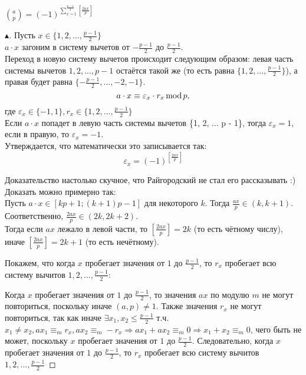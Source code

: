 \begin{theorem}
    $\binom{a}{p} = (-1)^{ \sum \limits_{x=1}^{ \frac{p-1}{2} } \left[ \frac{2ax}{p} \right] }$
    \begin{proof}[$\blacktriangle$]
        Пусть $x \in \{1, 2, ..., \frac{p - 1}{2}\}$\\
        $a \cdot x$ загоним в систему вычетов от $-\frac{p-1}{2}$ до $\frac{p-1}{2}$.\\
        
        Переход в новую систему вычетов происходит следующим образом: левая часть системы вычетов ${1, 2, ..., p - 1}$ остаётся такой же (то есть равна $\{1, 2, ..., \frac{p - 1}{2}\}$), а правая будет равна $\{-\frac{p - 1}{2}, ..., -2, -1\}$.\\
        
        $$
            a \cdot x \equiv \varepsilon_x \cdot r_x \operatorname{mod}{p},
        $$ где $\varepsilon_x \in \{-1, 1\}, r_x \in \{1, 2, ..., \frac{p-1}{2}\}$\\
        
        Если $a \cdot x$ попадет в левую часть системы вычетов \{1, 2, ... p - 1\}, тогда $\varepsilon_x = 1$, если в правую, то $\varepsilon_x = -1$.\\
        
        Утверждается, что математически это записывается так:
        $$
            \varepsilon_x = (-1)^{\left[ \frac{2ax}{p} \right]}
        $$
        
        Доказательство настолько скучное, что Райгородский не стал его рассказывать :)\\
        
        Доказать можно примерно так:\\
        
        Пусть $a \cdot x \in [kp + 1; (k + 1)p - 1]$ для некоторого $k$. Тогда $\frac{ax}{p} \in (k, k + 1)$. Соответственно, $\frac{2ax}{p} \in (2k, 2k + 2)$.\\
        
        Тогда если $ax$ лежало в левой части, то $\left[ \frac{2ax}{p} \right] = 2k$ (то есть чётному числу), иначе $\left[ \frac{2ax}{p} \right] = 2k + 1$ (то есть нечётному).
        
        Покажем, что когда $x$ пробегает значения от $1$ до $\frac{p-1}{2}$, то $r_x$ пробегает всю систему вычитов $1, 2, ..., \frac{p-1}{2}$:
        
        Когда $x$ пробегает значения от $1$ до $\frac{p-1}{2}$, то значения $ax$ по модулю $m$ не могут повториться, поскольку иначе $(a, p) \neq 1$. Также значения $r_x$ не могут повториться, так как иначе $\exists x_1, x_2 \leq \frac{p-1}{2}$ т.ч. $x_1 \neq x_2, ax_1 \equiv_m r_x, ax_2 \equiv_m -r_x \Rightarrow ax_1 + ax_2 \equiv_m 0 \Rightarrow x_1 + x_2 \equiv_m 0$, чего быть не может, поскольку $x$ пробегает значения от $1$ до $\frac{p-1}{2}$. Следовательно, когда $x$ пробегает значения от $1$ до $\frac{p-1}{2}$, то $r_x$ пробегает всю систему вычитов $1, 2, ..., \frac{p-1}{2}$
        

\end{proof}
\end{theorem}
